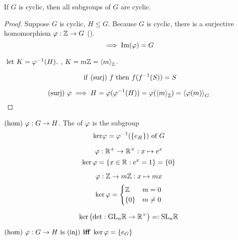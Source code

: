 \documentclass[12pt]{article}
\newcommand\im{\TR{Im}}
\newcommand\subgroup{\le}
\begin{document}
\bboxprop
\begin{prop}
    If \(G\) is cyclic, then all subgroups of \(G\)
    are cyclic.
\end{prop}
\ebox

\bboxproof
\begin{proof}
    Suppose \(G\) is cyclic, \(H\subgroup G\).
    Because \(G\) is cyclic, there is a surjective
    homomorphism \(\varphi:\mathbb Z\to G\) ().
    \[
        \implies \im(\vphi) = G
    \]

    \(\ \mathrm{let}\  K=\varphi^{-1}(H).\) , 
    \(K=m\mathbb Z=\left\langle m\right\rangle_\mathbb Z\).
    \bboxnote
    \begin{note}
        \[
            \ \mathrm{if}\ (\mathrm{surj})\ f
            \ \mathrm{then}\  f(f^{-1}(S))=S
        \]
    \end{note}
    \ebox
    \[
        (\mathrm{surj})\ \varphi\implies
        H=\varphi(\varphi^{-1}(H))
         =\varphi(\left\langle m\right\rangle_\mathbb Z)
         =\left\langle \varphi(m)\right\rangle_G
    \]
\end{proof}
\ebox

\bboxdefn
\begin{defn}[Kernel]
    \((\mathrm{hom})\ \varphi:G\to H\). The  of
    \(\varphi\) is the subgroup
    \[
        \mathrm{ker}\varphi=\varphi^{-1}(\{e_H\})\text{ of }G
    \]
\end{defn}
\ebox

\bboxexam
\begin{exam}
    \[
        \varphi:\mathbb R^+\to\mathbb R^\times:x\mapsto e^x
    \]
    \[
        \ker\varphi=\{x\in\mathbb R:e^x=1\}
                 =\{     0      \}
    \]
\end{exam}
\ebox


\bboxexam
\begin{exam}
    \[
        \varphi:\mathbb Z\to m\mathbb Z:x\mapsto mx
    \]
    \[
        \ker\varphi=
        \begin{cases}
            \mathbb Z    & m =    0 \\
            \{0\} & m \neq 0
        \end{cases}
    \]
\end{exam}
\ebox

\bboxexam
\begin{exam}
    \[
        \ker\left(
            \det : \mathrm{GL}_n\mathbb R \to \mathbb R^\times
        \right) =: \mathrm{SL}_n\mathbb R
    \]
\end{exam}
\ebox

\bboxprop
\begin{prop}
    \((\mathrm{hom})\ \varphi:G\to H\ \mathrm{is}\ (\mathrm{inj})
    \textbf{ iff }\ker\varphi=\{e_G\}\)
\end{prop}
\ebox
\end{document}
